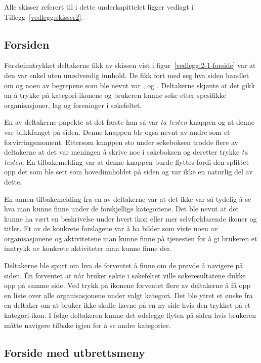 Alle skisser referert til i dette underkapittelet ligger vedlagt i Tillegg~\ref{vedlegg:skisser2}.

\subsection{Forsiden}
\label{section:test-forside-2.0}

Førsteinntrykket deltakerne fikk av skissen vist i figur~\ref{vedlegg:2-1-forside} 
var at den var enkel uten unødvendig innhold. De fikk fort med seg hva siden handlet om og noen av begrepene som ble nevnt var ,  og . Deltakerne skjønte at det gikk an å trykke på kategori-ikonene og brukeren kunne søke etter spesifikke organisasjoner, lag og foreninger i søkefeltet.

En av deltakerne påpekte at det første han så var {\em  ta testen}-knappen og at denne var blikkfanget på siden. Denne knappen ble også nevnt av andre som et forvirringsmoment. Ettersom knappen sto under søkeboksen trodde flere av deltakerne at det var meningen å skrive noe i søkeboksen og deretter trykke {\em  ta testen}. En tilbakemelding var at denne knappen burde flyttes fordi den splittet opp det som ble sett som hovedinnholdet på siden og var ikke en naturlig del av dette.

En annen tilbakemelding fra en av deltakerne var at det ikke var så tydelig å se hva man kunne finne under de forskjellige kategoriene. Det ble nevnt at det kunne ha vært en beskrivelse under hvert ikon eller mer selvforklarende ikoner og titler. Et av de konkrete forslagene var å ha bilder som viste noen av organisasjonene og aktivitetene man kunne finne på tjenesten for å gi brukeren et inntrykk av konkrete aktiviteter man kunne finne der.

Deltakerne ble spurt om hva de forventet å finne om de prøvde å navigere på siden. Én forventet at når bruker søkte i søkefeltet ville søkeresultatene dukke opp på samme side. Ved trykk på ikonene forventet flere av deltakerne å få opp en liste over alle organisasjonene under valgt kategori. Det ble ytret et ønske fra en deltaker om at bruker ikke skulle havne på en ny side hvis den trykket på et kategori-ikon. I følge deltakeren kunne det ødelegge flyten på siden hvis brukeren måtte navigere tilbake igjen for å se andre kategorier.


\subsection{Forside med utbrettsmeny}

